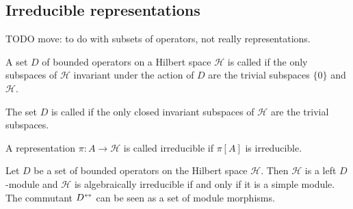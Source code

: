 \subsection{Irreducible representations}
TODO move: to do with subsets of operators, not really representations.

\begin{definition}
A set $D$ of bounded operators on a Hilbert space $\mathcal{H}$ is called  if the only subspaces of $\mathcal{H}$ invariant under the action of $D$ are the trivial subspaces $\{0\}$ and $\mathcal{H}$.

The set $D$ is called  if the only closed invariant subspaces of $\mathcal{H}$ are the trivial subspaces.

A representation $\pi: A\to\mathcal{H}$ is called irreducible if $\pi[A]$ is irreducible.
\end{definition}


Let $D$ be a set of bounded operators on the Hilbert space $\mathcal{H}$. Then $\mathcal{H}$ is a left $D$-module and $\mathcal{H}$ is algebraically irreducible if and only if it is a simple module. The commutant $D^\leftrightarrow$ can be seen as a set of module morphisms.

